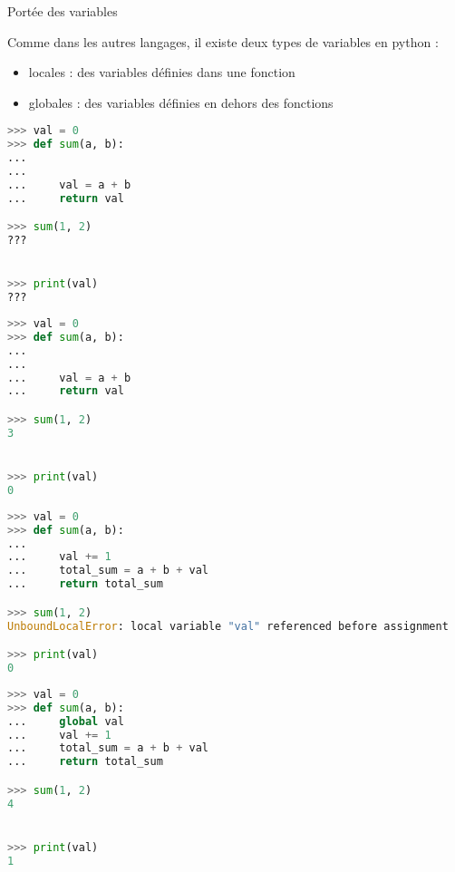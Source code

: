 \begin{frame}[fragile]{Portée des variables}
  
  Comme dans les autres langages, il existe deux types de variables en python :
  \begin{itemize}
    \item locales : des variables définies dans une fonction
    \item globales : des variables définies en dehors des fonctions
  \end{itemize}  

  \begin{overprint}
\begin{lstlisting}[language=Python, morekeywords={as, True}, numbers=none]
>>> val = 0
>>> def sum(a, b):
... 
... 
...     val = a + b
...     return val

>>> sum(1, 2)
???


>>> print(val)
???   
\end{lstlisting}

\begin{lstlisting}[language=Python, morekeywords={as, True}, numbers=none]
>>> val = 0
>>> def sum(a, b):
... 
... 
...     val = a + b
...     return val

>>> sum(1, 2)
3


>>> print(val)
0
\end{lstlisting}

\begin{lstlisting}[language=Python, morekeywords={as, True}, numbers=none]
>>> val = 0
>>> def sum(a, b):
...
...     val += 1
...     total_sum = a + b + val
...     return total_sum

>>> sum(1, 2)
UnboundLocalError: local variable "val" referenced before assignment

>>> print(val)
0
\end{lstlisting}


\begin{lstlisting}[language=Python, morekeywords={as, True}, numbers=none]
>>> val = 0
>>> def sum(a, b):
...     global val
...     val += 1
...     total_sum = a + b + val
...     return total_sum

>>> sum(1, 2)
4


>>> print(val)
1
\end{lstlisting}


  \end{overprint}
\end{frame}



